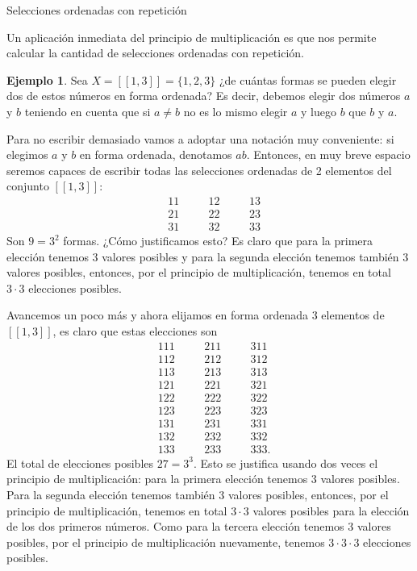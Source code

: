 \documentclass[11pt,spanish,makeidx]{amsbook}
\theoremstyle{definition}
\newtheorem{ejemplo}{Ejemplo}[section]
\theoremstyle{remark}
\begin{document}
\begin{section}{Selecciones ordenadas con repetición}

Un aplicación inmediata del principio de multiplicación  es que nos permite calcular la cantidad de selecciones ordenadas con repetición. 

\begin{ejemplo} Sea  $X = [[ 1 , 3]] = \{ 1, 2, 3 \}$ ¿de cuántas formas se pueden elegir dos de estos números en forma ordenada? Es decir, debemos elegir dos números $a$ y $b$ teniendo en cuenta que si $a\not=b$ no es lo mismo elegir $a$ y luego $b$ que $b$ y $a$.  

Para no escribir demasiado vamos a adoptar una notación muy conveniente: si elegimos $a$ y $b$ en forma ordenada, denotamos $ab$. Entonces, en muy breve espacio seremos capaces de escribir todas las selecciones ordenadas de 2 elementos del  conjunto  $[[ 1 , 3]]$:
\begin{align*}
&11&\quad &12&\quad &13 \\
&21&\quad &22&\quad &23\\
&31&\quad &32&\quad &33
\end{align*}
Son $9 = 3^2$ formas. ¿Cómo justificamos esto? Es claro que para la primera elección tenemos 3 valores posibles y para la segunda elección tenemos también 3 valores posibles, entonces, por el principio de multiplicación, tenemos en total $3\cdot 3$ elecciones posibles.  

Avancemos un poco más y ahora elijamos en forma ordenada 3 elementos de  $[[ 1 , 3]]$, es claro que estas elecciones son
\begin{align*}
&1 1 1&\quad &211&\quad &311 \\
&1 1 2&\quad & 212&\quad & 312\\
&1 1 3&\quad & 213&\quad & 313\\
&1 2 1&\quad & 221&\quad & 321\\
&1 2 2&\quad & 222&\quad & 322\\
&1 2 3&\quad & 223&\quad & 323\\
&1 3 1&\quad & 231&\quad & 331\\
&1 3 2&\quad & 232&\quad & 332\\
&1 3 3&\quad & 233&\quad & 333.
\end{align*}
El total de elecciones posibles $27 = 3^3$. Esto se justifica usando dos veces el principio de multiplicación: para la primera elección tenemos 3 valores posibles. Para la segunda elección tenemos también 3 valores posibles, entonces, por el principio de multiplicación, tenemos en total $3\cdot 3$ valores posibles para la elección de los dos primeros números. Como para la tercera elección tenemos 3 valores posibles, por el principio de multiplicación nuevamente, tenemos   $3\cdot 3 \cdot 3$ elecciones posibles.


\end{ejemplo}
\end{section}
\end{document}

